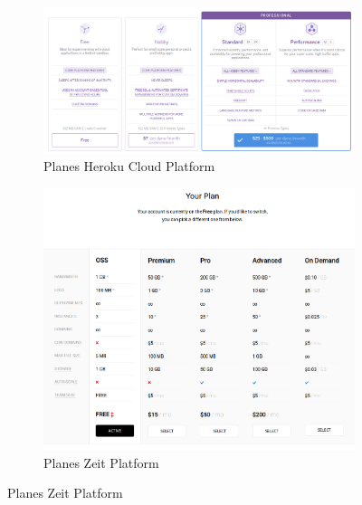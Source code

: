 \begin{figure}[hbtp] \centering
\begin{subfigure}{.6\textwidth}
    \includegraphics[width=\linewidth]{figuras/heroku-plan.png}
    \caption{Planes Heroku Cloud Platform}
    \label{fig::PlanesHerokuCloudPlatform}
\end{subfigure}

\begin{subfigure}{.6\textwidth}
    \includegraphics[width=\linewidth]{figuras/zeit-plan.png}
    \caption{Planes Zeit Platform}
    \label{fig::PlanesZeitPlatform}
\end{subfigure}


\end{figure}
